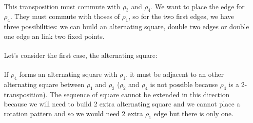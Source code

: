 \paragraph{}
This transposition must commute with $\rho_3$ and $\rho_4$. We want to place the edge for $\rho_4$. They must commute with thoses of $\rho_1$, so for the two first edges, we have three possibilities: we can build an alternating square, double two edges or double one edge an link two fixed points.

\paragraph{}
Let's consider the first case, the alternating square:

\begin{figure}[H]
  \begin{center}
    \caption{}
  \end{center}
\end{figure}

\paragraph{}
If $\rho_4$ forms an alternating square with $\rho_1$, it must be adjacent to an other alternating square between $\rho_1$ and $\rho_3$ ($\rho_2$ and $\rho_4$ is not possible because $\rho_4$ is a 2-transposition). The sequence of square cannot be extended in this direction because we will need to build 2 extra alternating square and we cannot place a rotation pattern and so we would need 2 extra $\rho_1$ edge but there is only one.

